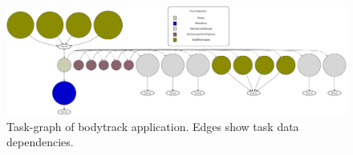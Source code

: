\begin{figure}[t!]%
	\center
	\includegraphics[width=\columnwidth]{ifcg/figures/bodytrack_taskgraph}%
	\caption{Task-graph of bodytrack application.  Edges show task data dependencies.}
	\label{fig:bodytrack_tg}%
	\vspace{.5cm}
\end{figure}



